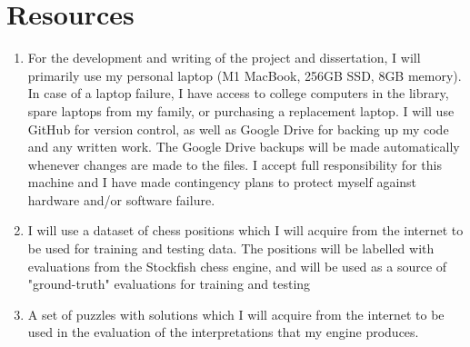 \documentclass[12pt,a4paper]{article}
\begin{document}
\section*{Resources}
\begin{enumerate}
    \item For the development and writing of the project and dissertation, I will primarily use my personal laptop (M1 MacBook, 256GB SSD, 8GB memory). In case of a laptop failure, I have access to college computers in the library, spare laptops from my family, or purchasing a replacement laptop. I will use GitHub for version control, as well as Google Drive for backing up my code and any written work. The Google Drive backups will be made automatically whenever changes are made to the files. I accept full responsibility for this machine and I have made contingency plans to protect myself against hardware and/or software failure.
    \item I will use a dataset of chess positions which I will acquire from the internet to be used for training and testing data. The positions will be labelled with evaluations from the Stockfish chess engine, and will be used as a source of "ground-truth" evaluations for training and testing
    \item A set of puzzles with solutions which I will acquire from the internet to be used in the evaluation of the interpretations that my engine produces.
\end{enumerate}
\end{document}
